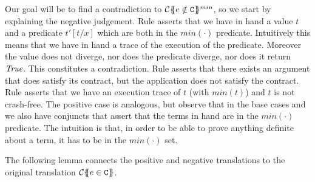 Our goal will be to find a contradiction to ${\cal C}\{\!\!\{e \notin {\tt C}\}\!\!\}^{min}$, so we start by explaining
the negative judgement. Rule  asserts that we have in hand a value $t$ and a predicate 
$t'[t/x]$ which are both in the $min(\cdot)$ predicate. Intuitively this means that we have in hand a trace 
of the execution of the predicate. Moreover the value does not diverge, nor does the predicate diverge, nor
does it return $\textit{True}$. This constitutes a contradiction. Rule  asserts that there exists an
argument that does satisfy its contract, but the application does not satisfy the contract. Rule 
asserts that we have an execution trace of $t$ (with $min(t)$) and $t$ is not crash-free. The positive case 
is analogous, but observe that in the base cases  and  we also have conjuncts that
assert that the terms in hand are in the $min(\cdot)$ predicate. The intuition is that, in order to be able to 
prove anything definite about a term, it has to be in the $min(\cdot)$ set.

The following lemma connects the positive and negative translations to the original translation ${\cal C}\{\!\!\{e \in {\tt C}\}\!\!\}$. 


